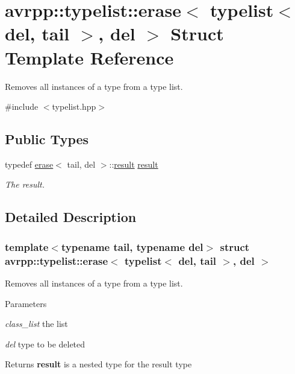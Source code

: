 \hypertarget{structavrpp_1_1typelist_1_1erase_3_01typelist_3_01del_00_01tail_01_4_00_01del_01_4}{
\section{avrpp::typelist::erase$<$ typelist$<$ del, tail $>$, del $>$ Struct Template Reference}
\label{structavrpp_1_1typelist_1_1erase_3_01typelist_3_01del_00_01tail_01_4_00_01del_01_4}
}


Removes all instances of a type from a type list.  




{\ttfamily \#include $<$typelist.hpp$>$}

\subsection*{Public Types}
\begin{DoxyCompactItemize}
\item 
typedef \hyperlink{structavrpp_1_1typelist_1_1erase}{erase}$<$ tail, del $>$::\hyperlink{structavrpp_1_1typelist_1_1typelist}{result} \hyperlink{structavrpp_1_1typelist_1_1erase_3_01typelist_3_01del_00_01tail_01_4_00_01del_01_4_addfd6335aa463ccd864c9df63d2d0526}{result}
\begin{DoxyCompactList}\small\item\em The result. \item\end{DoxyCompactList}\end{DoxyCompactItemize}


\subsection{Detailed Description}
\subsubsection*{template$<$typename tail, typename del$>$ struct avrpp::typelist::erase$<$ typelist$<$ del, tail $>$, del $>$}

Removes all instances of a type from a type list. 
\begin{DoxyParams}{Parameters}
\item[{\em class\_\-list}]the list \item[{\em del}]type to be deleted \end{DoxyParams}
\begin{DoxyReturn}{Returns}
{\bfseries result} is a nested type for the result type 
\end{DoxyReturn}



